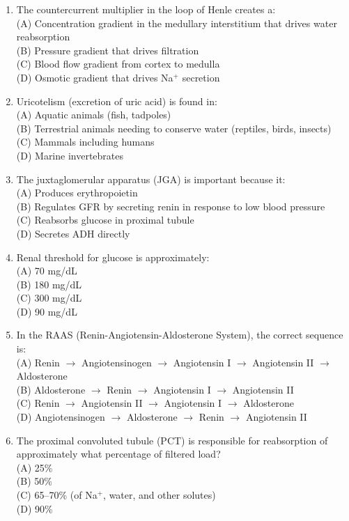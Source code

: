 \documentclass{article}
\begin{document}
\begin{enumerate}[label=Q\arabic*.]
\item The countercurrent multiplier in the loop of Henle creates a:
\\(A) Concentration gradient in the medullary interstitium that drives water reabsorption
\\(B) Pressure gradient that drives filtration
\\(C) Blood flow gradient from cortex to medulla
\\(D) Osmotic gradient that drives Na$^+$ secretion

\item Uricotelism (excretion of uric acid) is found in:
\\(A) Aquatic animals (fish, tadpoles)
\\(B) Terrestrial animals needing to conserve water (reptiles, birds, insects)
\\(C) Mammals including humans
\\(D) Marine invertebrates

\item The juxtaglomerular apparatus (JGA) is important because it:
\\(A) Produces erythropoietin
\\(B) Regulates GFR by secreting renin in response to low blood pressure
\\(C) Reabsorbs glucose in proximal tubule
\\(D) Secretes ADH directly

\item Renal threshold for glucose is approximately:
\\(A) 70 mg/dL
\\(B) 180 mg/dL
\\(C) 300 mg/dL
\\(D) 90 mg/dL

\item In the RAAS (Renin-Angiotensin-Aldosterone System), the correct sequence is:
\\(A) Renin $\rightarrow$ Angiotensinogen $\rightarrow$ Angiotensin I $\rightarrow$ Angiotensin II $\rightarrow$ Aldosterone
\\(B) Aldosterone $\rightarrow$ Renin $\rightarrow$ Angiotensin I $\rightarrow$ Angiotensin II
\\(C) Renin $\rightarrow$ Angiotensin II $\rightarrow$ Angiotensin I $\rightarrow$ Aldosterone
\\(D) Angiotensinogen $\rightarrow$ Aldosterone $\rightarrow$ Renin $\rightarrow$ Angiotensin II

\item The proximal convoluted tubule (PCT) is responsible for reabsorption of approximately what percentage of filtered load?
\\(A) 25\%
\\(B) 50\%
\\(C) 65--70\% (of Na$^+$, water, and other solutes)
\\(D) 90\%


\end{enumerate}
\end{document}
